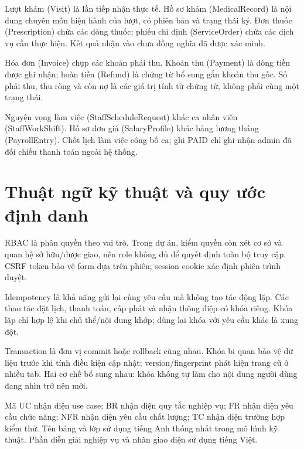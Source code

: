 Lượt khám (Visit) là lần tiếp nhận thực tế.\allowbreak{} Hồ sơ khám (Medical\allowbreak{}Record) là nội dung chuyên môn hiện hành của lượt, có phiên bản và trạng thái ký.\allowbreak{} Đơn thuốc (Prescription) chứa các dòng thuốc; phiếu chỉ định (Service\allowbreak{}Order) chứa các dịch vụ cần thực hiện.\allowbreak{} Kết quả nhận vào chưa đồng nghĩa đã được xác minh.\allowbreak{}

Hóa đơn (Invoice) chụp các khoản phải thu.\allowbreak{} Khoản thu (Payment) là dòng tiền được ghi nhận; hoàn tiền (Refund) là chứng từ bổ sung gắn khoản thu gốc.\allowbreak{} Số phải thu, thu ròng và còn nợ là các giá trị tính từ chứng từ, không phải cùng một trạng thái.\allowbreak{}

Nguyện vọng làm việc (Staff\allowbreak{}Schedule\allowbreak{}Request) khác ca nhân viên (Staff\allowbreak{}Work\allowbreak{}Shift).\allowbreak{} Hồ sơ đơn giá (Salary\allowbreak{}Profile) khác bảng lương tháng (Payroll\allowbreak{}Entry).\allowbreak{} Chốt lịch làm việc công bố ca; ghi PAID chỉ ghi nhận admin đã đối chiếu thanh toán ngoài hệ thống.\allowbreak{}


\section{Thuật ngữ kỹ thuật và quy ước định danh}
RBAC là phân quyền theo vai trò.\allowbreak{} Trong dự án, kiểm quyền còn xét cơ sở và quan hệ sở hữu/\allowbreak{}được giao, nên role không đủ để quyết định toàn bộ truy cập.\allowbreak{} CSRF token bảo vệ form dựa trên phiên; session cookie xác định phiên trình duyệt.\allowbreak{}

Idempotency là khả năng gửi lại cùng yêu cầu mà không tạo tác động lặp.\allowbreak{} Các thao tác đặt lịch, thanh toán, cấp phát và nhận thông điệp có khóa riêng.\allowbreak{} Khóa lặp chỉ hợp lệ khi chủ thể/\allowbreak{}nội dung khớp; dùng lại khóa với yêu cầu khác là xung đột.\allowbreak{}

Transaction là đơn vị commit hoặc rollback cùng nhau.\allowbreak{} Khóa bi quan bảo vệ dữ liệu trước khi tính điều kiện cập nhật; version/\allowbreak{}fingerprint phát hiện trang cũ ở nhiều tab.\allowbreak{} Hai cơ chế bổ sung nhau:\allowbreak{} khóa không tự làm cho nội dung người dùng đang nhìn trở nên mới.\allowbreak{}

Mã UC nhận diện use case; BR nhận diện quy tắc nghiệp vụ; FR nhận diện yêu cầu chức năng; NFR nhận diện yêu cầu chất lượng; TC nhận diện trường hợp kiểm thử.\allowbreak{} Tên bảng và lớp sử dụng tiếng Anh thống nhất trong mô hình kỹ thuật.\allowbreak{} Phần diễn giải nghiệp vụ và nhãn giao diện sử dụng tiếng Việt.\allowbreak{}


